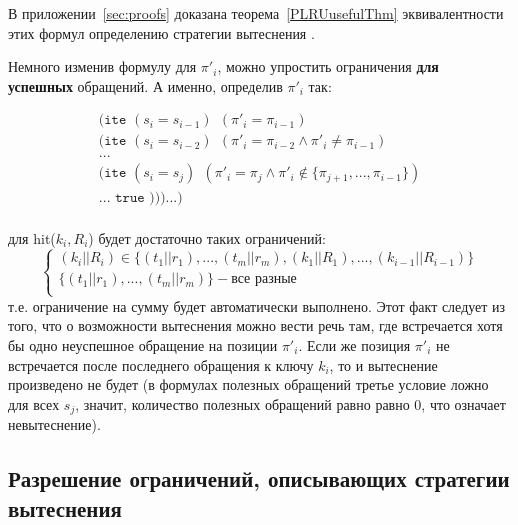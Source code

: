 В приложении~\ref{sec:proofs} доказана теорема~\ref{PLRUusefulThm} эквивалентности этих формул определению стратегии вытеснения \PseudoLRU.

Немного изменив формулу для $\pi'_i$, можно упростить ограничения \textbf{для}\\ \textbf{успешных} обращений. А именно, определив $\pi'_i$ так:

$$
\begin{array}{l}
\texttt{(ite~} (s_i = s_{i-1}) ~~ (\pi'_i = \pi_{i-1})\\
\texttt{(ite~} (s_i = s_{i-2}) ~~ (\pi'_i = \pi_{i-2} \wedge \pi'_i \neq \pi_{i-1})\\
...\\
\texttt{(ite~} (s_i = s_j) ~~ (\pi'_i = \pi_j \wedge \pi'_i \notin \{\pi_{j+1}, ..., \pi_{i-1}\})\\
... \texttt{~true )))...)}\\
\end{array}
$$

для hit($k_i, R_i$) будет достаточно таких ограничений:
$$
\left\{\begin{array}{l}
(k_i||R_i) \in \{(t_1||r_1), ..., (t_m||r_m), (k_1||R_1), ..., (k_{i-1}||R_{i-1})\}\\
\{(t_1||r_1), ..., (t_m||r_m)\} - \mbox{все разные}\\
\end{array} \right.
$$
т.е. ограничение на сумму будет автоматически выполнено. Этот факт следует из того, что о возможности вытеснения можно вести речь там, где встречается хотя бы одно неуспешное обращение на позиции $\pi'_i$. Если же позиция $\pi'_i$ не встречается после последнего обращения к ключу $k_i$, то и вытеснение произведено не будет (в формулах полезных обращений третье условие ложно для всех $s_j$, значит, количество полезных обращений равно равно 0, что означает невытеснение).

\subsection{Разрешение ограничений, описывающих стратегии вытеснения}


